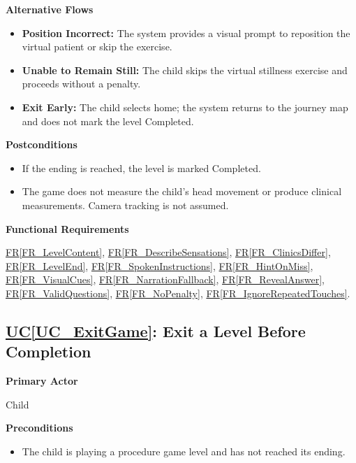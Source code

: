\documentclass[12pt]{article}
\newcounter{ucnum} %
\newcommand{\ucref}[1]{\hyperref[#1]{UC\ref*{#1}}}
\newcommand{\rref}[1]{\hyperref[#1]{FR\ref*{#1}}}
\begin{document}
\textbf{Alternative Flows}
\begin{itemize}
    \item \textbf{Position Incorrect:} The system provides a visual
    prompt to reposition the virtual patient or skip the exercise.
    \item \textbf{Unable to Remain Still:} The child skips the
    virtual stillness exercise and proceeds without a penalty.
    \item \textbf{Exit Early:} The child selects home; the system
    returns to the journey map and does not mark the level Completed.
\end{itemize}

\textbf{Postconditions}
\begin{itemize}
    \item If the ending is reached, the level is marked Completed.
    \item The game does not measure the child's head movement or
    produce clinical measurements. Camera tracking is not assumed.
\end{itemize}

\textbf{Functional Requirements}

\rref{FR_LevelContent}, \rref{FR_DescribeSensations}, \rref{FR_ClinicsDiffer}, \rref{FR_LevelEnd}, \rref{FR_SpokenInstructions}, \rref{FR_HintOnMiss}, \rref{FR_VisualCues}, \rref{FR_NarrationFallback}, \rref{FR_RevealAnswer}, \rref{FR_ValidQuestions}, \rref{FR_NoPenalty}, \rref{FR_IgnoreRepeatedTouches}.

\label{UC_ExitGame}
\subsection{\ucref{UC_ExitGame}: Exit a Level Before Completion}

\textbf{Primary Actor}

Child

\textbf{Preconditions}
\begin{itemize}
    \item The child is playing a procedure game level and has not
    reached its ending.
\end{itemize}
\end{document}
